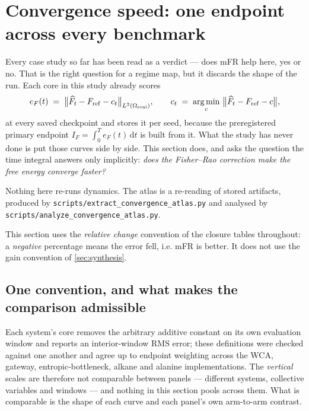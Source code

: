 \section{Convergence speed: one endpoint across every benchmark}
\label{sec:convergence}

Every case study so far has been read as a verdict --- does mFR help here, yes or no. That is
the right question for a regime map, but it discards the shape of the run. Each core in this
study already scores
\begin{equation}
  e_F(t) \;=\; \big\| \widehat F_t - F_{\mathrm{ref}} - c_t \big\|_{L^2(\Omega_{\mathrm{eval}})},
  \qquad
  c_t \;=\; \operatorname*{arg\,min}_{c}\, \big\| \widehat F_t - F_{\mathrm{ref}} - c \big\|,
  \label{eq:conv_eF}
\end{equation}
at every saved checkpoint and stores it per seed, because the preregistered primary endpoint
$I_F=\int_0^T e_F(t)\,\mathrm{d}t$ is built from it. What the study has never done is put those
curves side by side. This section does, and asks the question the time integral answers only
implicitly: \emph{does the Fisher--Rao correction make the free energy converge faster?}

Nothing here re-runs dynamics. The atlas is a re-reading of stored artifacts, produced by
\texttt{scripts/extract\_convergence\_atlas.py} and analysed by
\texttt{scripts/analyze\_convergence\_atlas.py}.

\begin{remark}
This section uses the \emph{relative change} convention of the closure tables throughout:
a \emph{negative} percentage means the error fell, i.e. mFR is better. It does not use the
gain convention of \cref{sec:synthesis}.
\end{remark}

\subsection{One convention, and what makes the comparison admissible}
\label{sec:conv_convention}

Each system's core removes the arbitrary additive constant on its own evaluation window and
reports an interior-window RMS error; these definitions were checked against one another and
agree up to endpoint weighting across the WCA, gateway, entropic-bottleneck, alkane and
alanine implementations. The \emph{vertical} scales are therefore not comparable between
panels --- different systems, collective variables and windows --- and nothing in this section
pools across them. What is comparable is the shape of each curve and each panel's own
arm-to-arm contrast.

